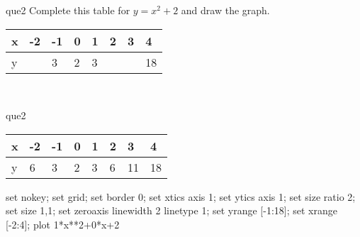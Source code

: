 \documentclass[13.5pt, varwidth=true]{beamer}
\begin{document}
\begin{frame}[shrink=19,fragile]
	\begin{beamercolorbox}[rounded=true, left, shadow=true,wd=14.8cm]{que2}
		 Complete this table for $y = x^{2} + 2$ and draw the graph. \\[0.3cm] \renewcommand{\arraystretch}{1.2}\begin{tabular}{|C|C|C|C|C|C|C|C|} \hline x & -2 & -1 & 0 & 1 & 2 & 3 & 4 \\ \hline y &  & 3 & 2 & 3 &  &  & 18\\ \hline \end{tabular}\\[0.3cm]
	\end{beamercolorbox}
\end{frame}
\begin{frame}[shrink=19,fragile]
	\begin{beamercolorbox}[rounded=true, left, shadow=true,wd=14.8cm]{que2}
		\renewcommand{\arraystretch}{1.2}\begin{tabular}{|C|C|C|C|C|C|C|C|} \hline x & -2 & -1 & 0 & 1 & 2 & 3 & 4 \\ \hline y & 6 & 3 & 2 & 3 & 6 & 11 & 18\\ \hline \end{tabular}\begin{gnuplot}[terminal=pdf] set nokey; set grid; set border 0; set xtics axis 1; set ytics axis 1; set size ratio 2; set size 1,1; set zeroaxis linewidth 2 linetype 1; set yrange [-1:18]; set xrange [-2:4]; plot 1*x**2+0*x+2 \end{gnuplot}
	\end{beamercolorbox}
\end{frame}
\end{document}
